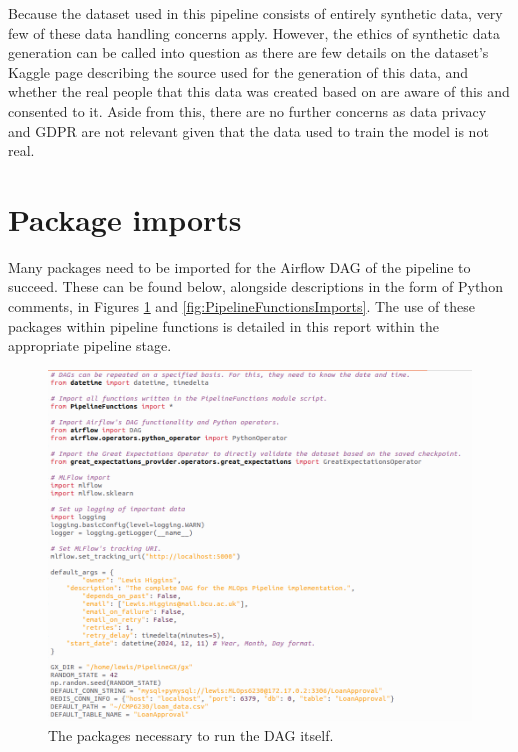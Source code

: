 \documentclass[12pt]{report}
\begin{document}
\noindent Because the dataset used in this pipeline consists of entirely synthetic data, very few of these data handling concerns apply. 
However, the ethics of synthetic data generation can be called into question as there are few details on the dataset's Kaggle 
page describing the source used for the generation of this data, and whether the real people that this data was created based 
on are aware of this and consented to it. Aside from this, there are no further concerns as data privacy and GDPR are not 
relevant given that the data used to train the model is not real.





\section{Package imports}
Many packages need to be imported for the Airflow DAG of the pipeline to succeed. These can be found 
below, alongside descriptions in the form of Python comments, in Figures \ref{fig:PipelineDAGImports} and 
\ref{fig:PipelineFunctionsImports}. The use of these packages within pipeline functions is detailed 
in this report within the appropriate pipeline stage.

\begin{figure}[H]
    \centering
    \includegraphics[width=\linewidth]{Implementation/.Code/PipelineDAGImports.png}
    \caption{The packages necessary to run the DAG itself.}
    \label{fig:PipelineDAGImports}
\end{figure}
\end{document}
